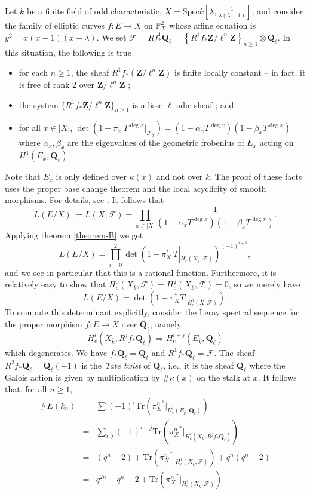 \noindent
Let $k$ be a finite field of odd characteristic, $X=\text{Spec} k\left[\lambda,
\frac{1}{\lambda(\lambda-1)}\right]$, and consider the family of elliptic
curves $f: E\to X$ on $\mathbb P^2_X$ whose affine equation is $y^2 =
x(x-1)(x-\lambda)$. We set $\mathcal{F} = Rf_*^1\mathbf{Q}_\ell =
\left\{R^1f_*\mathbf{Z}/\ell^n\mathbf{Z}\right\}_{n\geq 1}\otimes
\mathbf{Q}_\ell$. In this situation, the following is true
\begin{itemize}	
\item for each $n \geq 1$, the sheaf $R^1f_*(\mathbf{Z}/\ell^n\mathbf{Z})$ is
finite locally constant -- in fact, it is free of rank 2 over
$\mathbf{Z}/\ell^n\mathbf{Z}$ ;
\item the system $\{R^1f_*\mathbf{Z}/\ell^n\mathbf{Z}\}_{n\geq 1}$ is a lisse
$\ell$-adic sheaf ; and
\item for all $x\in |X|$, $\det\left(1-\pi_x\ T^{\deg
x}\big|_{\mathcal{F}_{\bar x}}\right) = (1-\alpha_x T^{\deg x})(1-\beta_x
T^{\deg x })$ where $\alpha_x, \beta_x$ are the eigenvalues of the geometric
frobenius of $E_x$ acting on $H^1(E_{\bar x}, \mathbf{Q}_\ell)$.
\end{itemize}
Note that $E_x$ is only defined over $\kappa(x)$ and not over $k$. The proof of
these facts uses the proper base change theorem and the local acyclicity of
smooth morphisms. For details, see \cite{SGA4.5}. It follows that
$$
L(E/X) := L(X, \mathcal{F}) = \prod_{x\in |X|}
\frac{1}{(1-\alpha_xT^{\deg x})(1-\beta_xT^{\deg x })} .
$$
Applying theorem \ref{theorem-B} we get
$$
L(E/X) = \prod_{i=0}^2\det\left(1-\pi_X^*\ T\left|_{H_c^i(X_{\bar k},
\mathcal{F})}\right.\right)^{(-1)^{i+1}},
$$
and we see in particular that this is a rational function. Furthermore, it is
relatively easy to show that $H_c^0(X_{\bar k}, \mathcal{F}) = H_c^2(X_{\bar
k}, \mathcal{F}) = 0$, so we merely have
$$
L(E/X) = \det\left(1-\pi_X^*T\big|_{H_c^1(X, \mathcal{F})}\right).
$$
To compute this determinant explicitly, consider the Leray spectral sequence
for the proper morphism $f:E \to X$ over $\mathbf{Q}_\ell$, namely
$$
H_c^i(X_{\bar k}, R^jf_*\mathbf{Q}_\ell) \Rightarrow H_c^{i+j}(E_{\bar
k},\mathbf{Q}_\ell)
$$
which degenerates. We have $f_*\mathbf{Q}_\ell=\mathbf{Q}_\ell$ and
$R^1f_*\mathbf{Q}_\ell = \mathcal{F}$. The sheaf $R^2f_*\mathbf{Q}_\ell =
\mathbf{Q}_\ell(-1)$ is the {\it Tate twist} of $\mathbf{Q}_\ell$, i.e.,
it is the sheaf $\mathbf{Q}_\ell$ where the Galois action is given by
multiplication by $\#\kappa(x)$ on the stalk at $\bar x$. It follows that,
for all $n\geq 1$,
\begin{eqnarray*}
\# E(k_n) & = & \sum(-1)^i\text{Tr}\left({\pi_E^n}^*\big|_{H_c^i(E_{\bar k},
\mathbf{Q}_\ell)}\right)\\
& = & \sum_{i, j}(-1)^{i+j}\text{Tr}\left({\pi^n_X}^*\big|_{H_c^i(X_{\bar k},
R^jf_*\mathbf{Q}_\ell)}\right)\\
& = & (q^n-2) + \text{Tr}\left( {\pi_X^n}^*\big|_{H_c^1(X_{\bar k},
\mathcal{F})}\right)+ q^n (q^n-2)\\
& = & q^{2n} - q^n-2 +\text{Tr}\left( {\pi_X^n}^*\big|_{H_c^1(X_{\bar k},
\mathcal{F})}\right)
\end{eqnarray*}
